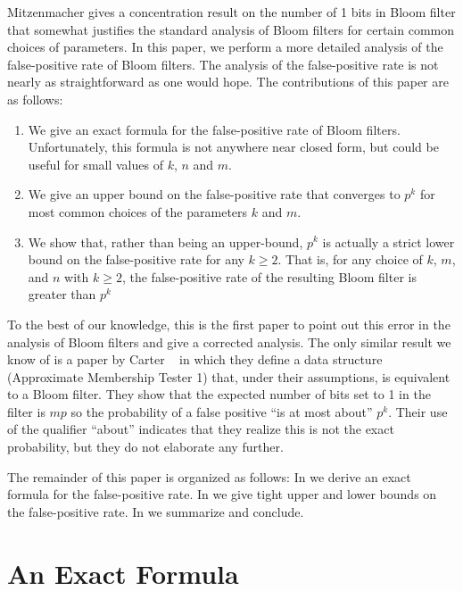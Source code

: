 \documentclass[lotsofwhite]{patmorin}
\begin{document}
Mitzenmacher \cite{m02} gives a concentration result on the number of
1 bits in Bloom filter that somewhat justifies the standard analysis
of Bloom filters for certain common choices of parameters.  In this
paper, we perform a more detailed analysis of the false-positive rate
of Bloom filters.  The analysis of the false-positive rate is not
nearly as straightforward as one would hope. The contributions of this
paper are as follows: \begin{enumerate}

\item We give an exact formula for the false-positive rate of Bloom filters.
Unfortunately, this formula is not anywhere near closed form, but
could be useful for small values of $k$, $n$ and $m$.

\item We give an upper bound on the false-positive rate that converges to
 $p^k$ for most common choices of the parameters $k$ and $m$.

\item We show that, rather than being an upper-bound,
$p^k$ is actually a strict lower bound on the
false-positive rate for any $k\ge 2$.  That is, for any choice of $k$,
$m$, and $n$ with $k\ge 2$, the false-positive rate of the resulting
Bloom filter is greater than $p^k$
\end{enumerate}

To the best of our knowledge, this is the first paper to point out
this error in the analysis of Bloom filters and give a corrected
analysis.  The only similar result we know of is a paper
by Carter \etal\ \cite{cfgmw78} in which they define a data structure
(Approximate Membership Tester 1) that, under their assumptions, is
equivalent to a Bloom filter.  They show that the expected number of
bits set to 1 in the filter is $mp$ so the probability of
a false positive ``is at most about'' $p^k$.  Their use
of the qualifier ``about'' indicates that they realize this is not the
exact probability, but they do not elaborate any further.

The remainder of this paper is organized as follows:  In
 we derive an exact formula for the false-positive rate.  In
 we give tight upper and lower bounds on the
false-positive rate.  In  we summarize and
conclude.

\section{An Exact Formula}
\end{document}
